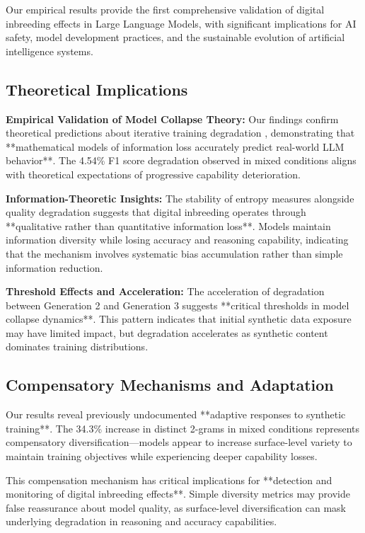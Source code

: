 \documentclass{article}
\begin{document}
Our empirical results provide the first comprehensive validation of digital inbreeding effects in Large Language Models, with significant implications for AI safety, model development practices, and the sustainable evolution of artificial intelligence systems.

\subsection{Theoretical Implications}

\textbf{Empirical Validation of Model Collapse Theory:} Our findings confirm theoretical predictions about iterative training degradation \cite{shumailov2024curse}, demonstrating that **mathematical models of information loss accurately predict real-world LLM behavior**. The 4.54\% F1 score degradation observed in mixed conditions aligns with theoretical expectations of progressive capability deterioration.

\textbf{Information-Theoretic Insights:} The stability of entropy measures alongside quality degradation suggests that digital inbreeding operates through **qualitative rather than quantitative information loss**. Models maintain information diversity while losing accuracy and reasoning capability, indicating that the mechanism involves systematic bias accumulation rather than simple information reduction.

\textbf{Threshold Effects and Acceleration:} The acceleration of degradation between Generation 2 and Generation 3 suggests **critical thresholds in model collapse dynamics**. This pattern indicates that initial synthetic data exposure may have limited impact, but degradation accelerates as synthetic content dominates training distributions.

\subsection{Compensatory Mechanisms and Adaptation}

Our results reveal previously undocumented **adaptive responses to synthetic training**. The 34.3\% increase in distinct 2-grams in mixed conditions represents compensatory diversification—models appear to increase surface-level variety to maintain training objectives while experiencing deeper capability losses.

This compensation mechanism has critical implications for **detection and monitoring of digital inbreeding effects**. Simple diversity metrics may provide false reassurance about model quality, as surface-level diversification can mask underlying degradation in reasoning and accuracy capabilities.
\end{document}
